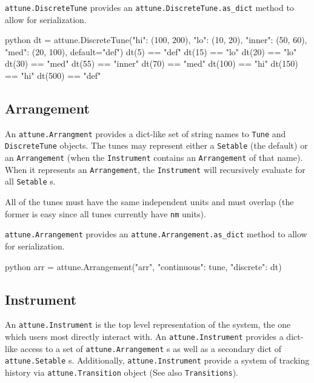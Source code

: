 \texttt{attune.DiscreteTune} provides an
\texttt{attune.DiscreteTune.as\_dict} method to allow
for serialization.

\begin{codefragment}{python}
dt = attune.DiscreteTune({"hi": (100, 200), "lo": (10, 20), "inner": (50, 60), "med": (20, 100)}, default="def")
dt(5) == "def"
dt(15) == "lo"
dt(20) == "lo"
dt(30) == "med"
dt(55) == "inner"
dt(70) == "med"
dt(100) == "hi"
dt(150) == "hi"
dt(500) == "def"
\end{codefragment}

\hypertarget{arrangement}{%
\subsection{Arrangement}\label{arrangement}}

An \texttt{attune.Arrangment} provides a dict-like set
of string names to \texttt{Tune} and
\texttt{DiscreteTune} objects. The tunes may
represent either a \texttt{Setable} (the default)
or an \texttt{Arrangement} (when the
\texttt{Instrument} contains an
\texttt{Arrangement} of that name). When it
represents an \texttt{Arrangement}, the
\texttt{Instrument} will recursively evaluate
for all \texttt{Setable} s.

All of the tunes must have the same independent units and must overlap
(the former is easy since all tunes currently have \texttt{nm} units).

\texttt{attune.Arrangement} provides an
\texttt{attune.Arrangement.as\_dict} method to allow
for serialization.

\begin{codefragment}{python}
arr = attune.Arrangement("arr", {"continuous": tune, "discrete": dt})
\end{codefragment}

\hypertarget{instrument}{%
\subsection{Instrument}\label{instrument}}

An \texttt{attune.Instrument} is the top level
representation of the system, the one which users most directly interact
with. An \texttt{attune.Instrument} provides a
dict-like access to a set of
\texttt{attune.Arrangement} s as well as a secondary
dict of \texttt{attune.Setable} s. Additionally,
\texttt{attune.Instrument} provide a system of tracking
history via \texttt{attune.Transition} object (See also
\texttt{Transitions}).


